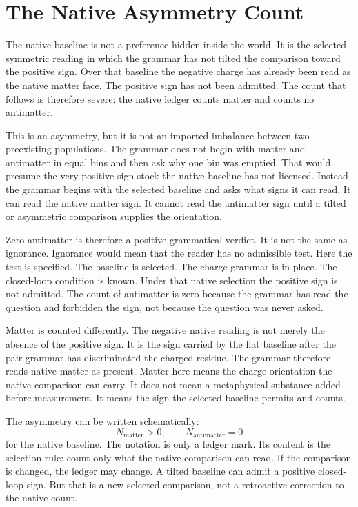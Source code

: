 \section{The Native Asymmetry Count}

The native baseline is not a preference hidden inside the world. It is the
selected symmetric reading in which the grammar has not tilted the
comparison toward the positive sign. Over that baseline the negative charge
has already been read as the native matter face. The positive sign has not
been admitted. The count that follows is therefore severe: the native ledger
counts matter and counts no antimatter.

This is an asymmetry, but it is not an imported imbalance between two
preexisting populations. The grammar does not begin with matter and
antimatter in equal bins and then ask why one bin was emptied. That would
presume the very positive-sign stock the native baseline has not licensed.
Instead the grammar begins with the selected baseline and asks what signs it
can read. It can read the native matter sign. It cannot read the antimatter
sign until a tilted or asymmetric comparison supplies the orientation.

Zero antimatter is therefore a positive grammatical verdict. It is not the
same as ignorance. Ignorance would mean that the reader has no admissible
test. Here the test is specified. The baseline is selected. The charge
grammar is in place. The closed-loop condition is known. Under that native
selection the positive sign is not admitted. The count of antimatter is zero
because the grammar has read the question and forbidden the sign, not because
the question was never asked.

Matter is counted differently. The negative native reading is not merely the
absence of the positive sign. It is the sign carried by the flat baseline
after the pair grammar has discriminated the charged residue. The grammar
therefore reads native matter as present. Matter here means the charge
orientation the native comparison can carry. It does not mean a metaphysical
substance added before measurement. It means the sign the selected baseline
permits and counts.

The asymmetry can be written schematically:
\[
  N_{\mathrm{matter}} > 0,
  \qquad
  N_{\mathrm{antimatter}} = 0
\]
for the native baseline. The notation is only a ledger mark. Its content is
the selection rule: count only what the native comparison can read. If the
comparison is changed, the ledger may change. A tilted baseline can admit a
positive closed-loop sign. But that is a new selected comparison, not a
retroactive correction to the native count.

